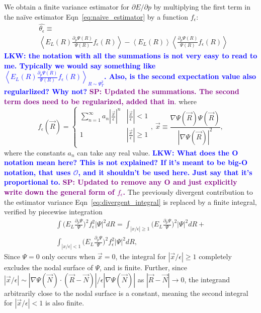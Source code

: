 \documentclass[twocolumn]{revtex4-1}
\newcommand{\lucas}[1]{\textbf{\textcolor{blue}{LKW: #1}}}
\newcommand{\shivesh}[1]{\textbf{\textcolor{purple}{SP: #1}}}
\begin{document}
We obtain a finite variance estimator for $\partial E/\partial p$ by multiplying the first term in the na\"ive estimator Eqn~\ref{eq:naive_estimator} by a function $f_\epsilon$:
\begin{equation}
\begin{split}
&\hat{\theta_\epsilon} \equiv \\ 
&\left\langle E_L(R) \frac{\partial_p \Psi(R)}{\Psi(R)} f_\epsilon(R) \right\rangle - \left\langle E_L(R) \right \rangle \left \langle \frac{\partial_p \Psi(R)}{\Psi(R)} f_\epsilon(R) \right\rangle
\label{eq:regularized_estimator}
\end{split}
\end{equation}
\lucas{the notation with all the summations is not very easy to read to me. Typically we would say something like $\left\langle E_L(R) \frac{\partial_p \Psi(R)}{\Psi(R)} f_\epsilon(R) \right\rangle_{R\sim\Psi_T^2}$. Also, is the second expectation value also regularlized? Why not?}
\shivesh{Updated the summations. The second term does need to be regularized, added that in}.
where 
\begin{equation}
f_\epsilon(\vec{R}) = \begin{cases} 
      \sum_{n=1}^{\infty} a_n |\frac{\vec{x}}{\epsilon}|^n & |\frac{\vec{x}}{\epsilon}| < 1 \\
      1 & |\frac{\vec{x}}{\epsilon}| \ge 1 \\
   \end{cases},\ \vec{x} \equiv \frac{\nabla \Psi(\vec{R}) \Psi(\vec{R})}{|\nabla \Psi(\vec{R})|^2},
\label{eq:regularizing_function}
\end{equation} 
where the constants $a_n$ can take any real value.
\lucas{What does the O notation mean here? This is not explained? If it's meant to be big-O notation, that uses $\mathcal{O}$, and it shouldn't be used here. Just say that it's proportional to.} 
\shivesh{Updated to remove any O and just explicitly write down the general form of $f_\epsilon$.}
The previously divergent contribution to the estimator variance Eqn~\ref{eq:divergent_integral} is replaced by a finite integral, verified by piecewise integration
\begin{equation}
\begin{split}
\int \Big(E_L\frac{\partial_p\Psi}{\Psi}\Big)^2 f_\epsilon^2 |\Psi|^2 dR = \int_{|x/\epsilon|\geq 1} \Big(E_L\frac{\partial_p\Psi}{\Psi}\Big)^2 |\Psi|^2 dR +\\ \int_{|x/\epsilon|< 1} \Big(E_L\frac{\partial_p\Psi}{\Psi}\Big)^2 f_\epsilon^2 |\Psi|^2 dR,
\end{split}
\label{eq:convergent_integral}
\end{equation}
Since $\Psi = 0$ only occurs when $\vec{x} = 0$, the integral for $|\vec{x}/\epsilon|\geq 1$ completely excludes the nodal surface of $\Psi$, and is finite. 
Further, since $|\vec{x}/\epsilon| \sim |\nabla\Psi(\vec{N}) \cdot (\vec{R}-\vec{N})|/\epsilon|\nabla  \Psi(\vec{N})|$ as $|\vec{R} - \vec{N}| \rightarrow 0$, the integrand arbitrarily close to the nodal surface is a constant, meaning the second integral for $|\vec{x}/\epsilon| < 1$ is also finite.
\end{document}
